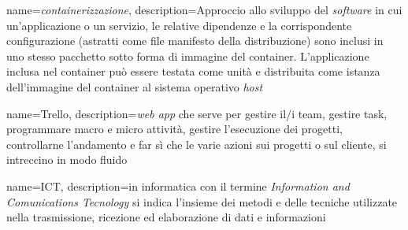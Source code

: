 {
    name={\textit{containerizzazione}},
    description={Approccio allo sviluppo del \textit{software} in cui un'applicazione o un servizio, le relative dipendenze e la corrispondente configurazione (astratti come file manifesto della distribuzione) sono inclusi in uno stesso pacchetto sotto forma di immagine del \gls{container}. L'applicazione inclusa nel \gls{container} può essere testata come unità e distribuita come istanza dell'immagine del \gls{container} al sistema operativo \textit{host}}
}

{
    name={Trello},
    description={\textit{web app} che serve per gestire il/i team, gestire task, programmare macro e micro attività, gestire l'esecuzione dei progetti, controllarne l'andamento e far sì che le varie azioni sui progetti o sul cliente, si intreccino in modo fluido}
}

{
    name={ICT},
    description={in informatica con il termine \textit{Information and Comunications Tecnology} 
    si indica l'insieme dei metodi e delle tecniche utilizzate nella trasmissione, ricezione 
    ed elaborazione di dati e informazioni}
}


